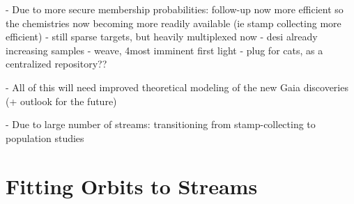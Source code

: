 \documentclass[final,5p,times,twocolumn,authoryear]{elsarticle}
\begin{document}

- Due to more secure membership probabilities: follow-up now more efficient so the chemistries now becoming more readily available (ie stamp collecting more efficient)
- still sparse targets, but heavily multiplexed now
- desi already increasing samples
- weave, 4most imminent first light
- plug for cats, as a centralized repository??

- All of this will need improved theoretical modeling of the new Gaia discoveries (+ outlook for the future)


- Due to large number of streams: transitioning from stamp-collecting to population studies

\appendix

\section{Fitting Orbits to Streams}
\label{apx:stream-fit}

%
\end{document}
